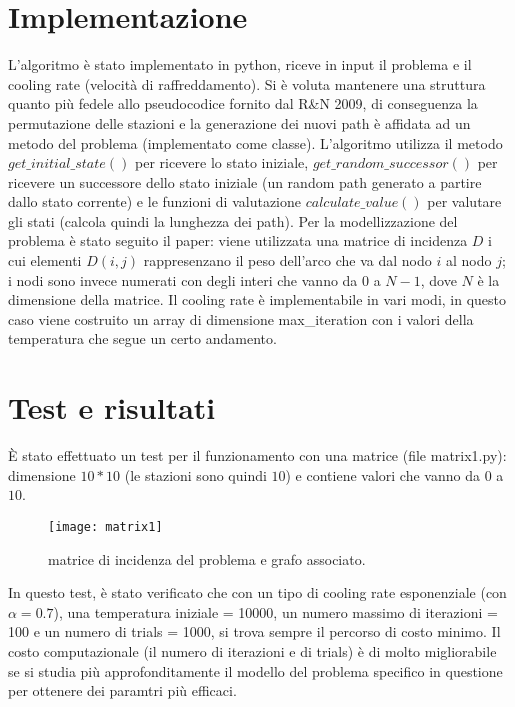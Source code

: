\documentclass[11pt]{article}
\begin{document}
    \restoregeometry



    \section{Implementazione} \label{sec:implementation}

        L'algoritmo è stato implementato in python, riceve in input il problema e il cooling rate (velocità di raffreddamento).
        Si è voluta mantenere una struttura quanto più fedele allo pseudocodice fornito dal R&N 2009, di conseguenza la permutazione delle stazioni e
        la generazione dei nuovi path è affidata ad un metodo del problema (implementato come classe).
        L'algoritmo utilizza il metodo $get\_initial\_state()$ per ricevere lo stato iniziale, $get\_random\_successor()$ per ricevere un
        successore dello stato iniziale (un random path generato a partire dallo stato corrente) e le funzioni di valutazione $calculate\_value()$
        per valutare gli stati (calcola quindi la lunghezza dei path).
        Per la modellizzazione del problema è stato seguito il paper: viene utilizzata una matrice di incidenza $D$ i cui elementi $D(i,j)$ rappresenzano il
        peso dell'arco che va dal nodo $i$ al nodo $j$; i nodi sono invece numerati con degli interi che vanno da $0$ a $N-1$, dove $N$ è la dimensione della matrice.
        Il cooling rate è implementabile in vari modi, in questo caso viene costruito un array di dimensione max\_iteration con i valori della temperatura che
        segue un certo andamento.

    \section{Test e risultati} \label{sec:test_and_results}

        È stato effettuato un test per il funzionamento con una matrice (file matrix1.py): dimensione $10*10$ (le stazioni sono quindi $10$) e
        contiene valori che vanno da $0$ a $10$.

        \begin{figure}[h]
            \centering
            \texttt{[image: matrix1]}
            \caption{matrice di incidenza del problema e grafo associato.}
            \label{fig:matrix1}
        \end{figure}

        In questo test, è stato verificato che con un tipo di cooling rate esponenziale (con $\alpha = 0.7$), una temperatura iniziale = 10000,
        un numero massimo di iterazioni = 100 e un numero di trials = 1000, si trova sempre il percorso di costo minimo.
        Il costo computazionale (il numero di iterazioni e di trials) è di molto migliorabile se si studia più approfonditamente il modello
        del problema specifico in questione per ottenere dei paramtri più efficaci.
\end{document}

